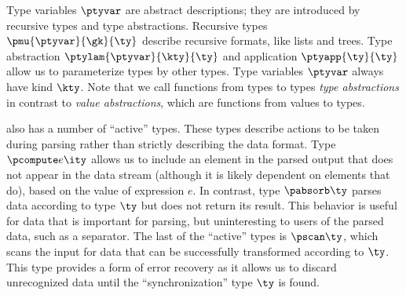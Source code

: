 Type variables $\ptyvar$ are abstract descriptions; they are
introduced by recursive types and type abstractions. Recursive types
$\pmu{\ptyvar}{\gk}{\ty}$ describe recursive formats, like lists and
trees. Type abstraction $\ptylam{\ptyvar}{\kty}{\ty}$ and application
$\ptyapp{\ty}{\ty}$ allow us to parameterize types by other types.
Type variables $\ptyvar$ always have kind $\kty$. Note that we call
functions from types to types {\em type abstractions} in contrast to
{\em value abstractions}, which are functions from values to types.

\ddc{} also has a number of ``active'' types.  These types describe
actions to be taken during parsing rather than strictly describing the
data format. Type $\pcompute e \ity$ allows us to include an element
in the parsed output that does not appear in the data stream (although
it is likely dependent on elements that do), based on the value of
expression $e$.  In contrast, type $\pabsorb \ty$ parses data
according to type $\ty$ but does not return its result. This behavior
is useful for data that is important for parsing, but uninteresting to
users of the parsed data, such as a separator. The last of the
``active'' types is $\pscan \ty$, which scans the input for data that
can be successfully transformed according to $\ty$. This type provides
a form of error recovery as it allows us to discard unrecognized data
until the ``synchronization'' type $\ty$ is found.

